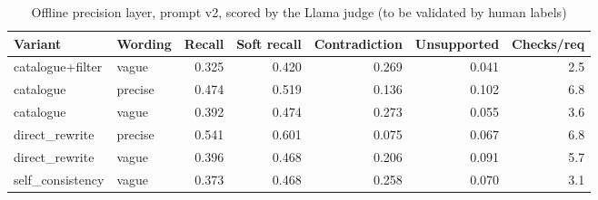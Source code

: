\begin{table}[t]\centering\small
\caption{Offline precision layer, prompt v2, scored by the Llama judge (to be validated by human labels)}
\begin{tabular}{llrrrrr}
\toprule
Variant & Wording & Recall & Soft recall & Contradiction & Unsupported & Checks/req \\
\midrule
catalogue+filter & vague & 0.325 & 0.420 & 0.269 & 0.041 & 2.5 \\
catalogue & precise & 0.474 & 0.519 & 0.136 & 0.102 & 6.8 \\
catalogue & vague & 0.392 & 0.474 & 0.273 & 0.055 & 3.6 \\
direct\_rewrite & precise & 0.541 & 0.601 & 0.075 & 0.067 & 6.8 \\
direct\_rewrite & vague & 0.396 & 0.468 & 0.206 & 0.091 & 5.7 \\
self\_consistency & vague & 0.373 & 0.468 & 0.258 & 0.070 & 3.1 \\
\bottomrule
\end{tabular}
\label{tab:precision}
\end{table}
